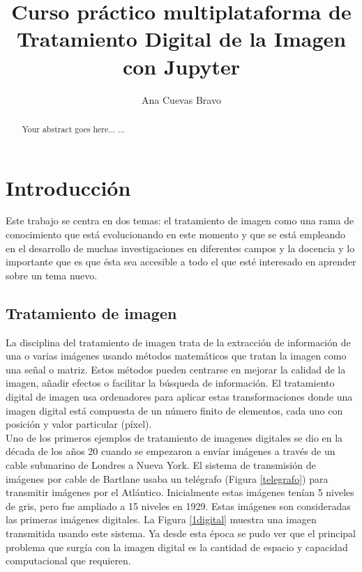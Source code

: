 \documentclass[a4paper,12pt]{report}
\begin{document}
\title{Curso práctico multiplataforma de Tratamiento Digital de la Imagen con Jupyter}
\author{ Ana Cuevas Bravo}
\maketitle

\newpage
{}

\renewcommand{\abstractname}{Resumen}
\renewcommand{\chaptername}{Capítulo}

\begin{abstract}
Your abstract goes here...
...
\end{abstract}


\tableofcontents
\newpage
{}

\chapter{Introducción}

Este trabajo se centra en dos temas: el tratamiento de imagen como una rama de conocimiento que está evolucionando en este momento y que se está empleando en el desarrollo de muchas investigaciones en diferentes campos y la docencia y lo importante que es que ésta sea accesible a todo el que esté interesado en aprender sobre un tema nuevo.\\

\section{Tratamiento de imagen}

La disciplina del tratamiento de imagen trata de la extracción de información de una o varias imágenes usando métodos matemáticos que tratan la imagen como una señal o matriz. Estos métodos pueden centrarse en mejorar la calidad de la imagen, añadir efectos o facilitar la búsqueda de información. El tratamiento digital de imagen usa ordenadores para aplicar estas transformaciones donde una imagen digital está compuesta de un número finito de elementos, cada uno con posición y valor particular (píxel).\\

Uno de los primeros ejemplos de tratamiento de imagenes digitales se dio en la década de los años 20 cuando se empezaron a envíar imágenes a través de un cable submarino de Londres a Nueva York. El sistema de transmisión de imágenes por cable de Bartlane usaba un telégrafo (Figura \ref{telegrafo}) para transmitir imágenes por el Atlántico. Inicialmente estas imágenes tenían 5 niveles de gris, pero fue ampliado a 15 niveles en 1929. Estas imágenes son consideradas las primeras imágenes digitales. La Figura \ref{1digital} muestra una imagen transmitida usando este sistema. Ya desde esta época se pudo ver que el principal problema que surgía con la imagen digital es la cantidad de espacio y capacidad computacional que requieren.\\
\end{document}
